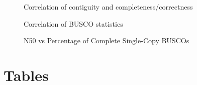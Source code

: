 \documentclass[twocolumn, dvipsnames]{bmcart}%
\def\texttt{[image: ]}
\begin{document}
\begin{backmatter}
\begin{figure}[h!]
  \caption{Correlation of contiguity and completeness/correctness}
  \label{fig:correlation}
\end{figure}

\begin{figure}[h!]
  \caption{Correlation of BUSCO statistics}
  \label{fig:busco_correlation}
\end{figure}

\begin{figure}[h!]
  \caption{N50 vs Percentage of Complete Single-Copy BUSCOs}
  \label{fig:N50_vs_complete}
\end{figure}


\section*{Tables}


\end{backmatter}
\end{document}
